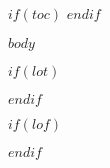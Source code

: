 \documentclass[english,personal,color,a4paper,hidelinks]{ubreport}
\begin{document}
\maketitle
\addtocounter{page}{1}
\clearpage
$if(toc)$
  \pagestyle{tocheadings}
  \tableofcontents
  \clearpage
$endif$
\pagestyle{headings}



$body$



\clearpage
$if(lot)$
  \listoftables
$endif$

\clearpage
$if(lof)$
  \listoffigures
$endif$



\newpage
{}

\end{document}
